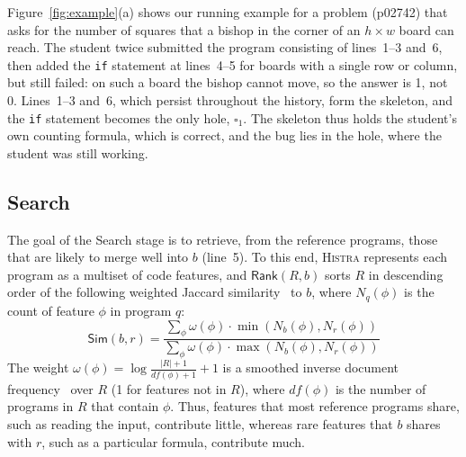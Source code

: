 \documentclass[10pt,conference]{IEEEtran}
\begin{document}
Figure~\ref{fig:example}(a) shows our running example for a problem (p02742) that asks for the number of squares that a bishop in the corner of an $h \times w$ board can reach. The student twice submitted the program consisting of lines~1--3 and~6, then added the \texttt{if} statement at lines~4--5 for boards with a single row or column, but still failed: on such a board the bishop cannot move, so the answer is 1, not 0. Lines~1--3 and~6, which persist throughout the history, form the skeleton, and the \texttt{if} statement becomes the only hole, $\square_1$. The skeleton thus holds the student's own counting formula, which is correct, and the bug lies in the hole, where the student was still working.

\subsection{Search}\label{sec:search}

The goal of the Search stage is to retrieve, from the reference programs, those that are likely to merge well into $b$ (line~5). To this end, \textsc{Histra} represents each program as a multiset of code features, and $\mathsf{Rank}(R, b)$ sorts $R$ in descending order of the following weighted Jaccard similarity~\cite{ioffe2010improved} to $b$, where $N_q(\phi)$ is the count of feature $\phi$ in program $q$:
\[ \mathsf{Sim}(b, r) = \frac{\sum_\phi \omega(\phi) \cdot \min(N_{b}(\phi), N_r(\phi))}{\sum_\phi \omega(\phi) \cdot \max(N_{b}(\phi), N_r(\phi))} \]
The weight $\omega(\phi) = \log\frac{|R| + 1}{\mathit{df}(\phi) + 1} + 1$ is a smoothed inverse document frequency~\cite{sparck1972statistical} over $R$ (1 for features not in $R$), where $\mathit{df}(\phi)$ is the number of programs in $R$ that contain $\phi$. Thus, features that most reference programs share, such as reading the input, contribute little, whereas rare features that $b$ shares with $r$, such as a particular formula, contribute much.
\end{document}

